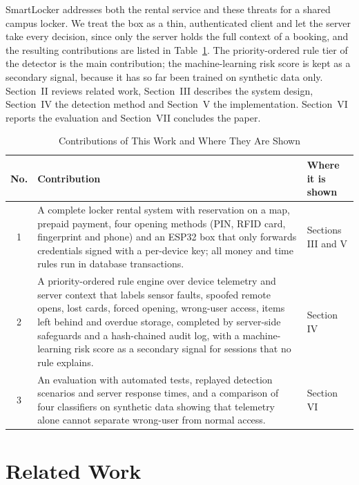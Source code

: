 SmartLocker addresses both the rental service and these threats for a shared campus locker. We treat the box as a thin,
authenticated client and let the server take every decision, since only the server holds the full context of a
booking, and the resulting contributions are listed in Table~\ref{tab:contrib}. The priority-ordered rule tier of the
detector is the main contribution; the machine-learning risk score is kept as a secondary signal, because it has so far
been trained on synthetic data only. Section~II reviews related work, Section~III describes the system design,
Section~IV the detection method and Section~V the implementation. Section~VI reports the evaluation and Section~VII
concludes the paper.

\begin{table}[!htbp]
\renewcommand{\arraystretch}{1.15}
\centering
\small
\caption{Contributions of This Work and Where They Are Shown}
\label{tab:contrib}
\begin{tabular}{c p{11.6cm} p{3.0cm}}
\hline
No. & Contribution & Where it is shown \\
\hline
1 & A complete locker rental system with reservation on a map, prepaid payment, four opening methods (PIN, RFID card,
    fingerprint and phone) and an ESP32 box that only forwards credentials signed with a per-device key; all money and
    time rules run in database transactions. & Sections III and V \\
2 & A priority-ordered rule engine over device telemetry and server context that labels sensor faults, spoofed remote
    opens, lost cards, forced opening, wrong-user access, items left behind and overdue storage, completed by
    server-side safeguards and a hash-chained audit log, with a machine-learning risk score as a secondary signal for
    sessions that no rule explains. & Section IV \\
3 & An evaluation with automated tests, replayed detection scenarios and server response times, and a comparison of
    four classifiers on synthetic data showing that telemetry alone cannot separate wrong-user from normal access. &
    Section VI \\
\hline
\end{tabular}
\end{table}

\section{Related Work}

